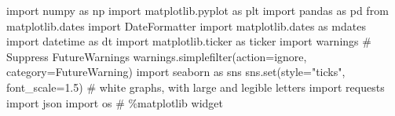 \documentclass[
  letterpaper,
  DIV=11,
  numbers=noendperiod,
  oneside]{scrreprt}
\newenvironment{Shaded}{\begin{snugshade}}{\end{snugshade}}
\newcommand{\BuiltInTok}[1]{\textcolor[rgb]{0.00,0.23,0.31}{#1}}
\newcommand{\CommentTok}[1]{\textcolor[rgb]{0.37,0.37,0.37}{#1}}
\newcommand{\FloatTok}[1]{\textcolor[rgb]{0.68,0.00,0.00}{#1}}
\newcommand{\ImportTok}[1]{\textcolor[rgb]{0.00,0.46,0.62}{#1}}
\newcommand{\NormalTok}[1]{\textcolor[rgb]{0.00,0.23,0.31}{#1}}
\newcommand{\OperatorTok}[1]{\textcolor[rgb]{0.37,0.37,0.37}{#1}}
\newcommand{\PreprocessorTok}[1]{\textcolor[rgb]{0.68,0.00,0.00}{#1}}
\newcommand{\StringTok}[1]{\textcolor[rgb]{0.13,0.47,0.30}{#1}}
\begin{document}
\begin{Shaded}
\begin{Highlighting}[]
\ImportTok{import}\NormalTok{ numpy }\ImportTok{as}\NormalTok{ np}
\ImportTok{import}\NormalTok{ matplotlib.pyplot }\ImportTok{as}\NormalTok{ plt}
\ImportTok{import}\NormalTok{ pandas }\ImportTok{as}\NormalTok{ pd}
\ImportTok{from}\NormalTok{ matplotlib.dates }\ImportTok{import}\NormalTok{ DateFormatter}
\ImportTok{import}\NormalTok{ matplotlib.dates }\ImportTok{as}\NormalTok{ mdates}
\ImportTok{import}\NormalTok{ datetime }\ImportTok{as}\NormalTok{ dt}
\ImportTok{import}\NormalTok{ matplotlib.ticker }\ImportTok{as}\NormalTok{ ticker}
\ImportTok{import}\NormalTok{ warnings}
\CommentTok{\# Suppress FutureWarnings}
\NormalTok{warnings.simplefilter(action}\OperatorTok{=}\StringTok{\textquotesingle{}ignore\textquotesingle{}}\NormalTok{, category}\OperatorTok{=}\PreprocessorTok{FutureWarning}\NormalTok{)}
\ImportTok{import}\NormalTok{ seaborn }\ImportTok{as}\NormalTok{ sns}
\NormalTok{sns.}\BuiltInTok{set}\NormalTok{(style}\OperatorTok{=}\StringTok{"ticks"}\NormalTok{, font\_scale}\OperatorTok{=}\FloatTok{1.5}\NormalTok{)  }\CommentTok{\# white graphs, with large and legible letters}
\ImportTok{import}\NormalTok{ requests}
\ImportTok{import}\NormalTok{ json}
\ImportTok{import}\NormalTok{ os}
\CommentTok{\# \%matplotlib widget}
\end{Highlighting}
\end{Shaded}
\end{document}

